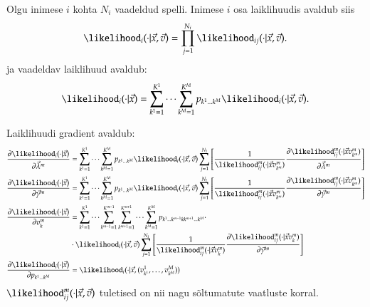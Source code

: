 \documentclass[a4paper]{article}
\numberwithin{equation}{subsection}
\begin{document}
Olgu inimese $i$ kohta $N_i$ vaadeldud spelli.  Inimese $i$ osa
laiklihuudis avaldub siis
\begin{equation}
  \likelihood_i(\cdot|\vec{x}, \vec{v}) = 
  \prod_{j=1}^{N_i} \likelihood_{ij}(\cdot|\vec{x}, \vec{v}).
\end{equation}
ja vaadeldav laiklihuud avaldub:
\begin{equation}
  \likelihood_i(\cdot|\vec{x}) = 
  \sum_{k^1=1}^{K^1} \dots \sum_{k^M=1}^{K^M} 
  p_{k^1 \dots k^M} 
  \likelihood_i(\cdot|\vec{x}, \vec{v}).
\end{equation}

Laiklihuudi gradient avaldub:
\begin{align}
  \frac{\partial \likelihood_i(\cdot|\vec{x})}
  {\partial \vec{\lambda}^m} & = 
  \sum_{k^1=1}^{K^1} \dots \sum_{k^M=1}^{K^M} 
  p_{k^1 \dots k^M} 
  \likelihood_i(\cdot|\vec{x}, \vec{v})
  \sum_{j=1}^{N_i} 
  \left[ 
    \frac{1}{\likelihood_{ij}^m(\cdot|\vec{x} v_{k^m}^m)} 
    \frac{\partial \likelihood_{ij}^m(\cdot|\vec{x} v_{k^m}^m)}
    {\partial \vec{\lambda}^m} 
  \right]
    \\
  \frac{\partial \likelihood_i(\cdot|\vec{x})}
  {\partial \vec{\gamma}^m} & = 
  \sum_{k^1=1}^{K^1} \dots \sum_{k^M=1}^{K^M} 
  p_{k^1 \dots k^M} 
  \likelihood_i(\cdot|\vec{x}, \vec{v})
  \sum_{j=1}^{N_i} 
  \left[ 
    \frac{1}{\likelihood_{ij}^m(\cdot|\vec{x} v_{k^m}^m)} 
    \frac{\partial \likelihood_{ij}^m(\cdot|\vec{x} v_{k^m}^m)}
    {\partial \vec{\gamma}^m} 
  \right]
    \\
  \frac{\partial \likelihood_i(\cdot|\vec{x})}
  {\partial v_k^m} & = 
  \sum_{k^1=1}^{K^1} \dots \sum_{k^{m-1}=1}^{K^{m-1}} 
  \sum_{k^{m+1}=1}^{K^{m+1}} \dots \sum_{k^M=1}^{K^M} 
  p_{k^1 \dots k^{m-1} k k^{m+1} \dots k^M} 
  \cdot
  \notag\\
  & \cdot
  \likelihood_i(\cdot|\vec{x}, \vec{v})
  \sum_{j=1}^{N_i} 
  \left[ 
    \frac{1}{\likelihood_{ij}^m(\cdot|\vec{x} v_{k}^m)} 
    \frac{\partial \likelihood_{ij}^m(\cdot|\vec{x} v_k^m)}
    {\partial \vec{\gamma}^m} 
  \right]
    \\
  \frac{\partial \likelihood_i(\cdot|\vec{x})}
  {\partial p_{k^1 \dots k^M}}
    & = 
  \likelihood_i(\cdot|\vec{x}, (v_{k^1}^1, \dots, v_{k^M}^M))
\end{align}
$\likelihood_{ij}^m(\cdot|\vec{x}, \vec{v})$ tuletised on nii nagu
sõltumatute vaatluste korral.
\end{document}
